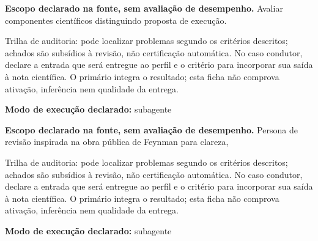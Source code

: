 \begin{descricao}
\textbf{Escopo declarado na fonte, sem avaliação de desempenho.}
Avaliar componentes científicos distinguindo proposta de execução.
\end{descricao}

\begin{funcao}
Trilha de auditoria: pode localizar problemas segundo os critérios descritos; achados são subsídios à revisão, não certificação automática. No caso condutor, declare a entrada que será entregue ao perfil e o critério para incorporar sua saída à nota científica. O primário integra o resultado; esta ficha não comprova ativação, inferência nem qualidade da entrega.
\end{funcao}

\begin{arquitetura}
\textbf{Modo de execução declarado:} subagente
\end{arquitetura}


\begin{descricao}
\textbf{Escopo declarado na fonte, sem avaliação de desempenho.}
Persona de revisão inspirada na obra pública de Feynman para clareza,
\end{descricao}

\begin{funcao}
Trilha de auditoria: pode localizar problemas segundo os critérios descritos; achados são subsídios à revisão, não certificação automática. No caso condutor, declare a entrada que será entregue ao perfil e o critério para incorporar sua saída à nota científica. O primário integra o resultado; esta ficha não comprova ativação, inferência nem qualidade da entrega.
\end{funcao}

\begin{arquitetura}
\textbf{Modo de execução declarado:} subagente
\end{arquitetura}


